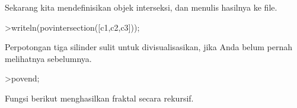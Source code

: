 \documentclass{article}
\begin{document}
\begin{eulernotebook}
\begin{eulercomment}
\begin{eulercomment}
\begin{eulercomment}
\begin{eulercomment}
\begin{eulercomment}
\begin{eulercomment}
\begin{eulercomment}
\begin{eulercomment}
\begin{eulercomment}
\begin{eulercomment}
\begin{eulercomment}
\begin{eulercomment}
\begin{eulercomment}
\begin{eulercomment}
\begin{eulercomment}
\begin{eulercomment}
\begin{eulercomment}
\begin{eulercomment}
\begin{eulercomment}
\begin{eulercomment}
\begin{eulercomment}
\begin{eulercomment}
\begin{eulercomment}
\begin{eulercomment}
\begin{euleroutput}
\end{euleroutput}
\begin{eulercomment}
Sekarang kita mendefinisikan objek interseksi, dan menulis hasilnya ke
file.
\end{eulercomment}
\begin{eulerprompt}
>writeln(povintersection([c1,c2,c3]));
\end{eulerprompt}
\begin{eulercomment}
Perpotongan tiga silinder sulit untuk divisualisasikan, jika Anda
belum pernah melihatnya sebelumnya.
\end{eulercomment}
\begin{eulerprompt}
>povend;
\end{eulerprompt}
\begin{eulercomment}
Fungsi berikut menghasilkan fraktal secara rekursif.


\end{eulercomment}
\end{eulercomment}
\end{eulercomment}
\end{eulercomment}
\end{eulercomment}
\end{eulercomment}
\end{eulercomment}
\end{eulercomment}
\end{eulercomment}
\end{eulercomment}
\end{eulercomment}
\end{eulercomment}
\end{eulercomment}
\end{eulercomment}
\end{eulercomment}
\end{eulercomment}
\end{eulercomment}
\end{eulercomment}
\end{eulercomment}
\end{eulercomment}
\end{eulercomment}
\end{eulercomment}
\end{eulercomment}
\end{eulercomment}
\end{eulercomment}
\end{eulernotebook}
\end{document}
